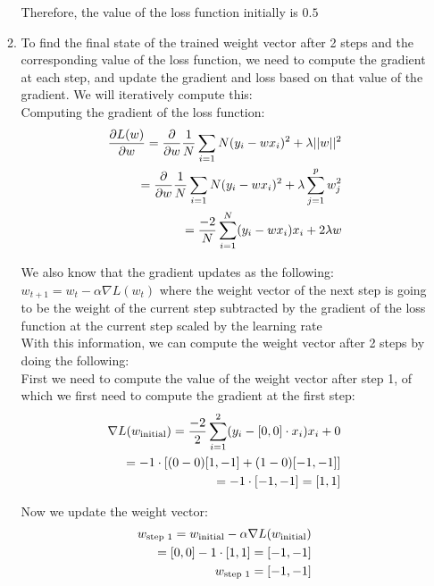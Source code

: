 \documentclass[12pt]{article}
\begin{document}
\begin{enumerate}
\begin{enumerate}
  Therefore, the value of the loss function initially is $0.5$

  \item To find the final state of the trained weight vector after 2 steps and the corresponding value of the loss function, we need to compute the gradient at each
  step, and update the gradient and loss based on that value of the gradient. We will iteratively compute this: \\ 

  Computing the gradient of the loss function: \\  
  \begin{align}
    \frac{\partial L(w)}{\partial w} = \frac{\partial}{\partial w} \frac{1}{N} \sum_{i = 1}{N} (y_i - wx_i)^2 + \lambda ||w||^2 \notag \\ 
    = \frac{\partial}{\partial w} \frac{1}{N} \sum_{i = 1}{N} (y_i - wx_i)^2 + \lambda \sum_{j=1}^{p}w_j^2 \notag \\ 
    = \frac{-2}{N} \sum_{i=1}^{N} (y_i - wx_i)x_i + 2 \lambda w \notag 
   \end{align}

   We also know that the gradient updates as the following: $w_{t+1} = w_t - \alpha \nabla L(w_t)$ where the weight vector of the next step is going to be the weight of the current step subtracted by the gradient of the loss function at the current step scaled by the learning rate\\

   With this information, we can compute the weight vector after 2 steps by doing the following: \\ 

   First we need to compute the value of the weight vector after step 1, of which we first need to compute the gradient at the first step: \\ 
   \begin{align}
    \nabla L(w_{\text{initial}}) = \frac{-2}{2} \sum_{i=1}^{2} (y_i - [0,0] \cdot x_i) x_i + 0 \notag \\ 
    = -1 \cdot [(0 - 0)[1,-1] + (1-0)[-1,-1]] \notag \\ 
    = -1 \cdot [-1,-1] = [1,1] \notag 
   \end{align}

   Now we update the weight vector: \\ 
   \begin{align}
    w_{\text{step 1}} = w_{\text{initial}} - \alpha \nabla L(w_{\text{initial}}) \notag \\ 
    = [0,0] - 1 \cdot [1,1] = [-1,-1] \notag \\ 
    w_{\text{step 1}} = [-1,-1] \notag
   \end{align}


\end{enumerate}
\end{enumerate}
\end{document}
